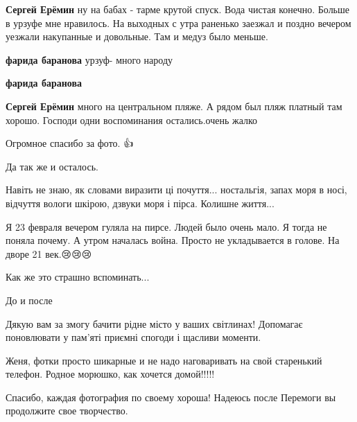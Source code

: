 \begin{multicols}{2}
\begin{itemize}
\textbf{Сергей Ерёмин} ну на бабах - тарме крутой спуск. Вода чистая конечно. Больше в урзуфе мне нравилось. На выходных с утра раненько заезжал и поздно вечером уезжали накупанные и довольные. Там и медуз было меньше.

\textbf{фарида баранова} урзуф- много народу

\textbf{фарида баранова}

\textbf{Сергей Ерёмин} много на центральном пляже. А рядом был пляж платный там хорошо. Господи одни воспоминания остались.очень жалко
\end{itemize} %


Огромное спасибо за фото. 👍


Да так же и осталось.


Навіть не знаю, як словами виразити ці почуття... ностальгія, запах моря в
носі, відчуття вологи шкірою, дзвуки моря і пірса. Колишне життя...


Я 23 февраля вечером гуляла на пирсе. Людей было очень мало. Я тогда не поняла
почему. А утром началась война. Просто не укладывается в голове. На дворе 21
век.😢😢😢


Как же это страшно вспоминать...

До и после


Дякую вам за змогу бачити рідне місто у ваших світлинах! Допомагає поновлювати
у пам'яті приємні спогоди і щасливи моменти.


Женя, фотки просто шикарные и не надо наговаривать на свой старенький телефон.
Родное морюшко, как хочется домой!!!!!


Спасибо, каждая фотография по своему хороша! Надеюсь после Перемоги вы продолжите свое творчество.


\end{multicols} %
